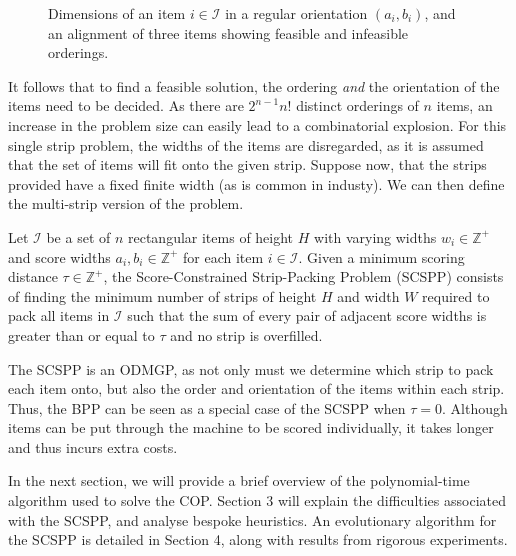 \documentclass{elsarticle}
\begin{document}
\begin{figure}[H]	
	\centering
	
	\caption{Dimensions of an item $i \in \mathcal{I}$ in a regular orientation $(a_i, b_i)$, and an alignment of three items showing feasible and infeasible orderings.}	
	\label{fig:itemsknife}
\end{figure}


It follows that to find a feasible solution, the ordering \emph{and} the orientation of the items need to be decided. As there are $2^{n-1} n!$ distinct orderings of $n$ items, an increase in the problem size can easily lead to a combinatorial explosion. For this single strip problem, the widths of the items are disregarded, as it is assumed that the set of items will fit onto the given strip. Suppose now, that the strips provided have a fixed finite width (as is common in industy). We can then define the multi-strip version of the problem.

\begin{definition}
	\label{defn:scspp}
	Let $\mathcal{I}$ be a set of $n$ rectangular items of height $H$ with varying widths $w_i \in \mathbb{Z}^+$ and score widths $a_i, b_i \in \mathbb{Z}^+$ for each item $i \in \mathcal{I}$. Given a minimum scoring distance $\tau \in \mathbb{Z}^+$, the Score-Constrained Strip-Packing Problem (SCSPP) consists of finding the minimum number of strips of height $H$ and width $W$ required to pack all items in $\mathcal{I}$ such that the sum of every pair of adjacent score widths is greater than or equal to $\tau$ and no strip is overfilled.
\end{definition}

The SCSPP is an ODMGP, as not only must we determine which strip to pack each item onto, but also the order and orientation of the items within each strip. Thus, the BPP can be seen as a special case of the SCSPP when $\tau = 0$. Although items can be put through the machine to be scored individually, it takes longer and thus incurs extra costs.


In the next section, we will provide a brief overview of the polynomial-time algorithm used to solve the COP. Section 3 will explain the difficulties associated with the SCSPP, and analyse bespoke heuristics. An evolutionary algorithm for the SCSPP is detailed in Section 4, along with results from rigorous experiments.  
\end{document}
